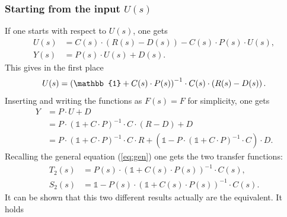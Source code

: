 \documentclass[a4paper,12 pt]{article}
\numberwithin{equation}{section}
\theoremstyle{definition}
\theoremstyle{remark}
\theoremstyle{definition}
\theoremstyle{definition}
\theoremstyle{definition}
\theoremstyle{remark}
\begin{document}
\subsubsection*{Starting from the input $U(s)$}
If one starts with respect to $U(s)$, one gets
\begin{equation}
\begin{split}
U(s)&=C(s)\cdot \left( R(s)-D(s) \right)-C(s)\cdot P(s)\cdot U(s),\\
Y(s)&=P(s)\cdot U(s) + D(s).
\end{split}
\end{equation}
This gives in the first place
\begin{equation}
U(s)=\left( \mathbb{1}+ C(s)\cdot P(s) \right)^{-1}\cdot C(s)\cdot \left(R(s)-D(s)\right).\\
\end{equation}
Inserting and writing the functions as $F(s)=F$ for simplicity, one gets
\begin{equation}
\begin{split}
Y&=P\cdot U+D\\
&=P\cdot \left( \mathbb{1}+C\cdot P\right)^{-1}\cdot C \cdot (R-D)+D\\
&=P\cdot \left( \mathbb{1}+C\cdot P\right)^{-1}\cdot C \cdot R + \left( \mathbb{1}-P\cdot \left( \mathbb{1}+C\cdot P \right) ^{-1}\cdot C\right)\cdot D.
\end{split}
\end{equation}
Recalling the general equation (\ref{eq:gen}) one gets the two transfer functions:
\begin{equation}
\begin{split}
T_2(s)&=P(s)\cdot \left(\mathbb{1}+ C(s)\cdot P(s)\right)^{-1}\cdot C(s),\\
S_2(s)&= \mathbb{1}-P(s)\cdot \left( \mathbb{1}+C(s)\cdot P(s) \right) ^{-1}\cdot C(s).
\end{split}
\end{equation}
It can be shown that this two different results actually are the equivalent. It holds
\end{document}
